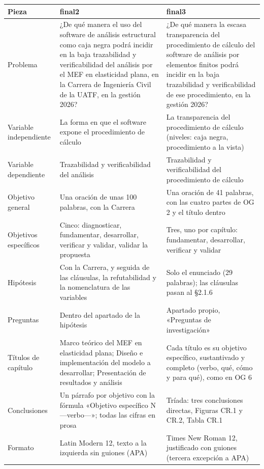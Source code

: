 \documentclass[11pt,a4paper]{article}
\begin{document}
{\small
\begin{longtable}{@{}L{2.6cm}L{6.4cm}L{6.4cm}@{}}
\toprule
\textbf{Pieza} & \textbf{final2} & \textbf{final3} \\
\midrule
\endhead
Problema & ¿De qué manera el uso del software de análisis estructural como caja negra podrá incidir en la baja trazabilidad y verificabilidad del análisis por el MEF en elasticidad plana, en la Carrera de Ingeniería Civil de la UATF, en la gestión 2026? & ¿De qué manera la escasa transparencia del procedimiento de cálculo del software de análisis por elementos finitos podrá incidir en la baja trazabilidad y verificabilidad de ese procedimiento, en la gestión 2026? \\
\midrule
Variable independiente & La forma en que el software expone el procedimiento de cálculo & La transparencia del procedimiento de cálculo (niveles: caja negra, procedimiento a la vista) \\
\midrule
Variable dependiente & Trazabilidad y verificabilidad del análisis & Trazabilidad y verificabilidad del procedimiento de cálculo \\
\midrule
Objetivo general & Una oración de unas 100 palabras, con la Carrera & Una oración de 41 palabras, con las cuatro partes de OG 2 y el título dentro \\
\midrule
Objetivos específicos & Cinco: diagnosticar, fundamentar, desarrollar, verificar y validar, validar la propuesta & Tres, uno por capítulo: fundamentar, desarrollar, verificar y validar \\
\midrule
Hipótesis & Con la Carrera, y seguida de las cláusulas, la refutabilidad y la nomenclatura de las variables & Solo el enunciado (29 palabras); las cláusulas pasan al §2.1.6 \\
\midrule
Preguntas & Dentro del apartado de la hipótesis & Apartado propio, «Preguntas de investigación» \\
\midrule
Títulos de capítulo & Marco teórico del MEF en elasticidad plana; Diseño e implementación del modelo a desarrollar; Presentación de resultados y análisis & Cada título es su objetivo específico, sustantivado y completo (verbo, qué, cómo y para qué), como en OG 6 \\
\midrule
Conclusiones & Un párrafo por objetivo con la fórmula «Objetivo específico N ---verbo---»; todas las cifras en prosa & Tríada: tres conclusiones directas, Figuras CR.1 y CR.2, Tabla CR.1 \\
\midrule
Formato & Latin Modern 12, texto a la izquierda sin guiones (APA) & Times New Roman 12, justificado con guiones (tercera excepción a APA) \\
\bottomrule
\end{longtable}}
\end{document}
